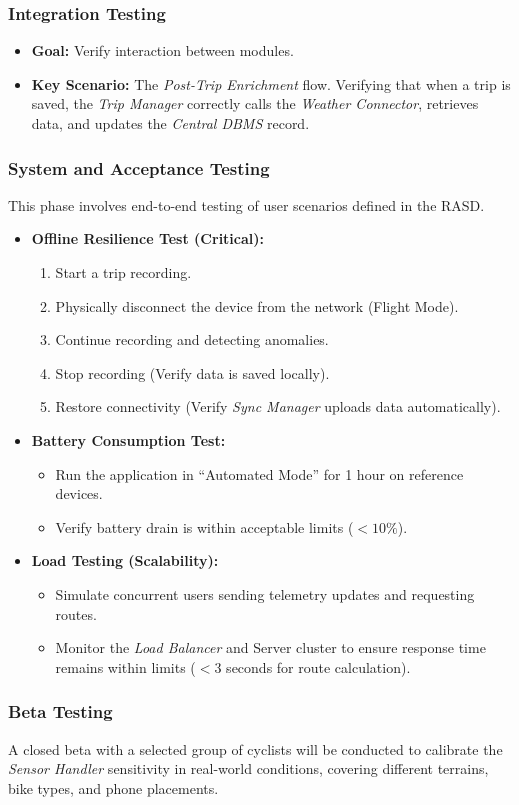 \subsubsection{Integration Testing}
\begin{itemize}
    \item \textbf{Goal:} Verify interaction between modules.
    \item \textbf{Key Scenario:} The \textit{Post-Trip Enrichment} flow. Verifying that when a trip is saved, the \textit{Trip Manager} correctly calls the \textit{Weather Connector}, retrieves data, and updates the \textit{Central DBMS} record.
\end{itemize}
\newpage
\subsubsection{System and Acceptance Testing}
This phase involves end-to-end testing of user scenarios defined in the RASD.

\begin{itemize}
    \item \textbf{Offline Resilience Test (Critical):}
    \begin{enumerate}
        \item Start a trip recording.
        \item Physically disconnect the device from the network (Flight Mode).
        \item Continue recording and detecting anomalies.
        \item Stop recording (Verify data is saved locally).
        \item Restore connectivity (Verify \textit{Sync Manager} uploads data automatically).
    \end{enumerate}


    \item \textbf{Battery Consumption Test:}
    \begin{itemize}
        \item Run the application in ``Automated Mode'' for 1 hour on reference devices.
        \item Verify battery drain is within acceptable limits ($< 10\%$).
    \end{itemize}

    \item \textbf{Load Testing (Scalability):}
    \begin{itemize}
        \item Simulate concurrent users sending telemetry updates and requesting routes.
        \item Monitor the \textit{Load Balancer} and Server cluster to ensure response time remains within limits ($< 3$ seconds for route calculation).
    \end{itemize}
\end{itemize}

\subsubsection{Beta Testing}
A closed beta with a selected group of cyclists will be conducted to calibrate the \textit{Sensor Handler} sensitivity in real-world conditions, covering different terrains, bike types, and phone placements.